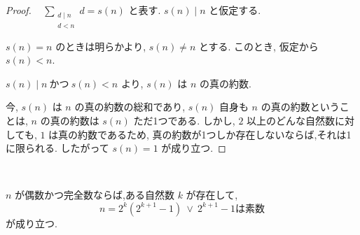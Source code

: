 \begin{proof}~
\(\sum_{\substack{d \mid n\\ d < n}} d = s(n)\) と表す. \(s(n) \mid n\) と仮定する.

\(s(n) = n\) のときは明らかより, \(s(n) \neq n\) とする. このとき, 仮定から \(s(n) < n\).

\(s(n) \mid n ~\text{かつ} ~ s(n) < n\) より, \(s(n)\) は \(n\) の真の約数.

今, \(s(n)\) は \(n\) の真の約数の総和であり, \(s(n)\) 自身も \(n\) の真の約数ということは,
\(n\) の真の約数は \(s(n)\) ただ1つである.
しかし, \(2\) 以上のどんな自然数に対しても, \(1\) は真の約数であるため,
真の約数が1つしか存在しないならば,それは1に限られる.
したがって \(s(n) = 1\) が成り立つ.
\end{proof}


\begin{theorem}[Euler]\label{eq_two_pow_mul_prime_mersenne_of_even_perfect}
\leanok{}~\

\(n\) が偶数かつ完全数ならば,ある自然数 \(k\) が存在して,
\[
n = 2^k (2^{k+1} - 1) ~\vee~ 2^{k+1} - 1 \text{は素数}
\]
が成り立つ.

\end{theorem}

